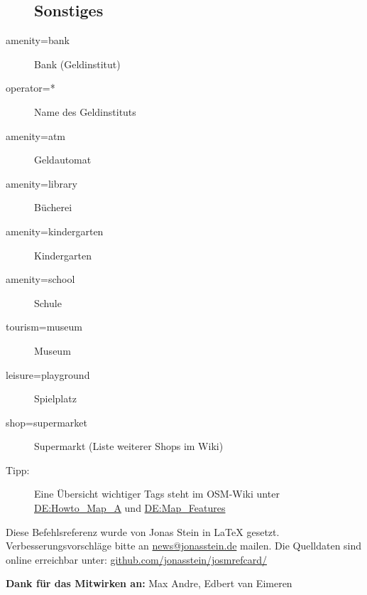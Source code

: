 \documentclass[a4paper,11pt,notumble]{leaflet}
\begin{document}
\begin{flushleft}
\begin{description}
\subsection*{Sonstiges}
\item[amenity=bank] Bank (Geldinstitut)
\item[operator=*] Name des Geldinstituts
\item[amenity=atm] Geldautomat
\item[amenity=library] Bücherei
\item[amenity=kindergarten] Kindergarten
\item[amenity=school] Schule
\item[tourism=museum] Museum
\item[leisure=playground] Spielplatz
\item[shop=supermarket] Supermarkt (Liste weiterer Shops im Wiki)
\\
\item[Tipp:] Eine Übersicht wichtiger Tags steht im OSM-Wiki unter
\href{http://wiki.osm.org/wiki/DE:Howto_Map_A}{DE:Howto\_Map\_A} und
\href{http://wiki.openstreetmap.org/wiki/DE:Map_Features}{DE:Map\_Features}
\end{description}
\end{flushleft}




Diese Befehlsreferenz wurde von Jonas Stein in \LaTeX{} gesetzt.
Verbesserungsvorschläge bitte an \href{mailto:news@jonasstein.de}{news@jonasstein.de} mailen.
Die Quelldaten sind online erreichbar unter: 
\href{http://github.com/jonasstein/josmrefcard/}{github.com/jonasstein/josmrefcard/}

\textbf{Dank für das Mitwirken an:} Max Andre, Edbert van Eimeren
\end{document}
